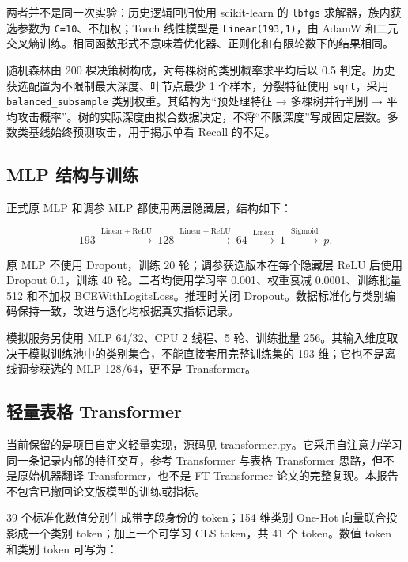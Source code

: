 \documentclass[UTF8,a4paper,11pt,fontset=fandol]{ctexart}
\begin{document}
两者并不是同一次实验：历史逻辑回归使用 scikit-learn 的 \texttt{lbfgs}
求解器，族内获选参数为 \texttt{C=10}、不加权；Torch 线性模型是
\texttt{Linear(193,1)}，由 AdamW
和二元交叉熵训练。相同函数形式不意味着优化器、正则化和有限轮数下的结果相同。

随机森林由 200 棵决策树构成，对每棵树的类别概率求平均后以 0.5
判定。历史获选配置为不限制最大深度、叶节点最少 1 个样本，分裂特征使用
\texttt{sqrt}，采用 \texttt{balanced\_subsample}
类别权重。其结构为``预处理特征 → 多棵树并行判别 →
平均攻击概率''。树的实际深度由拟合数据决定，不将``不限深度''写成固定层数。多数类基线始终预测攻击，用于揭示单看
Recall 的不足。

\subsection{MLP 结构与训练}\label{mlp-ux7ed3ux6784ux4e0eux8badux7ec3}

正式原 MLP 和调参 MLP 都使用两层隐藏层，结构如下：

\[193\ \xrightarrow{\mathrm{Linear+ReLU}}\ 128
\ \xrightarrow{\mathrm{Linear+ReLU}}\ 64
\ \xrightarrow{\mathrm{Linear}}\ 1
\ \xrightarrow{\mathrm{Sigmoid}}\ p.\]

原 MLP 不使用 Dropout，训练 20 轮；调参获选版本在每个隐藏层 ReLU 后使用
Dropout 0.1，训练 40 轮。二者均使用学习率 0.001、权重衰减
0.0001、训练批量 512 和不加权 BCEWithLogitsLoss。推理时关闭
Dropout。数据标准化与类别编码保持一致，改进与退化均根据真实指标记录。

模拟服务另使用 MLP 64/32、CPU 2 线程、5 轮、训练批量
256。其输入维度取决于模拟训练池中的类别集合，不能直接套用完整训练集的
193 维；它也不是离线调参获选的 MLP 128/64，更不是 Transformer。

\subsection{轻量表格
Transformer}\label{ux8f7bux91cfux8868ux683c-transformer}

当前保留的是项目自定义轻量实现，源码见
\href{https://github.com/ZureTz/ml-network-intrusion-detection/blob/master/src/ml_network_intrusion_detection/training/transformer.py}{transformer.py}。它采用自注意力学习同一条记录内部的特征交互，参考
Transformer 与表格 Transformer 思路，但不是原始机器翻译
Transformer，也不是 FT-Transformer
论文的完整复现。本报告不包含已撤回论文版模型的训练或指标。

39 个标准化数值分别生成带字段身份的 token；154 维类别 One-Hot
向量联合投影成一个类别 token；加上一个可学习 CLS token，共 41 个
token。数值 token 和类别 token 可写为：
\end{document}
